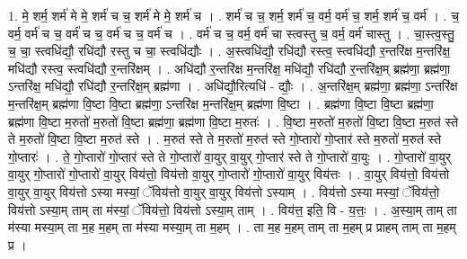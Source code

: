 \documentclass[17pt]{extarticle}
\begin{document}
1. मे॒ शर्म॒ शर्म॑ मे मे॒ शर्म॑ च च॒ शर्म॑ मे मे॒ शर्म॑ च । . शर्म॑ च च॒ शर्म॒ शर्म॑ च॒ वर्म॒ वर्म॑ च॒ शर्म॒ शर्म॑ च॒ वर्म॑ । . च॒ वर्म॒ वर्म॑ च च॒ वर्म॑ च च॒ वर्म॑ च च॒ वर्म॑ च । . वर्म॑ च च॒ वर्म॒ वर्म॑ चा स्त्वस्तु च॒ वर्म॒ वर्म॑ चास्तु । . चा॒स्त्व॒स्तु॒ च॒ चा॒ स्त्वधि॑द्यौ॒ रधि॑द्यौ रस्तु च चा॒ स्त्वधि॑द्यौः । . अ॒स्त्वधि॑द्यौ॒ रधि॑द्यौ रस्त्व॒ स्त्वधि॑द्यौ र॒न्तरि॑क्ष म॒न्तरि॑क्ष॒ मधि॑द्यौ रस्त्व॒ स्त्वधि॑द्यौ र॒न्तरि॑क्षम् । . अधि॑द्यौ र॒न्तरि॑क्ष म॒न्तरि॑क्ष॒ मधि॑द्यौ॒ रधि॑द्यौ र॒न्तरि॑क्ष॒म् ब्रह्म॑णा॒ ब्रह्म॑णा॒ ऽन्तरि॑क्ष॒ मधि॑द्यौ॒ रधि॑द्यौ र॒न्तरि॑क्ष॒म् ब्रह्म॑णा । . अधि॑द्यौ॒रित्यधि॑ - द्यौः॒ । . अ॒न्तरि॑क्ष॒म् ब्रह्म॑णा॒ ब्रह्म॑णा॒ ऽन्तरि॑क्ष म॒न्तरि॑क्ष॒म् ब्रह्म॑णा वि॒ष्टा वि॒ष्टा ब्रह्म॑णा॒ ऽन्तरि॑क्ष म॒न्तरि॑क्ष॒म् ब्रह्म॑णा वि॒ष्टा । . ब्रह्म॑णा वि॒ष्टा वि॒ष्टा ब्रह्म॑णा॒ ब्रह्म॑णा वि॒ष्टा म॒रुतो॑ म॒रुतो॑ वि॒ष्टा ब्रह्म॑णा॒ ब्रह्म॑णा वि॒ष्टा म॒रुतः॑ । . वि॒ष्टा म॒रुतो॑ म॒रुतो॑ वि॒ष्टा वि॒ष्टा म॒रुत॑ स्ते ते म॒रुतो॑ वि॒ष्टा वि॒ष्टा म॒रुत॑ स्ते । . म॒रुत॑ स्ते ते म॒रुतो॑ म॒रुत॑ स्ते गो॒प्तारो॑ गो॒प्तार॑ स्ते म॒रुतो॑ म॒रुत॑ स्ते गो॒प्तारः॑ । . ते॒ गो॒प्तारो॑ गो॒प्तार॑ स्ते ते गो॒प्तारो॑ वा॒युर् वा॒युर् गो॒प्तार॑ स्ते ते गो॒प्तारो॑ वा॒युः । . गो॒प्तारो॑ वा॒युर् वा॒युर् गो॒प्तारो॑ गो॒प्तारो॑ वा॒युर् विय॑त्तो॒ विय॑त्तो वा॒युर् गो॒प्तारो॑ गो॒प्तारो॑ वा॒युर् विय॑त्तः । . वा॒युर् विय॑त्तो॒ विय॑त्तो वा॒युर् वा॒युर् विय॑त्तो ऽस्या मस्यां॒ ॅविय॑त्तो वा॒युर् वा॒युर् विय॑त्तो ऽस्याम् । . विय॑त्तो ऽस्या मस्यां॒ ॅविय॑त्तो॒ विय॑त्तो ऽस्या॒म् ताम् ता म॑स्यां॒ ॅविय॑त्तो॒ विय॑त्तो ऽस्या॒म् ताम् । . विय॑त्त॒ इति॒ वि - य॒त्तः॒ । . अ॒स्या॒म् ताम् ता म॑स्या मस्या॒म् ता म॒ह म॒हम् ता म॑स्या मस्या॒म् ता म॒हम् । . ता म॒ह म॒हम् ताम् ता म॒हम् प्र प्राहम् ताम् ता म॒हम् प्र । \newline
\end{document}

